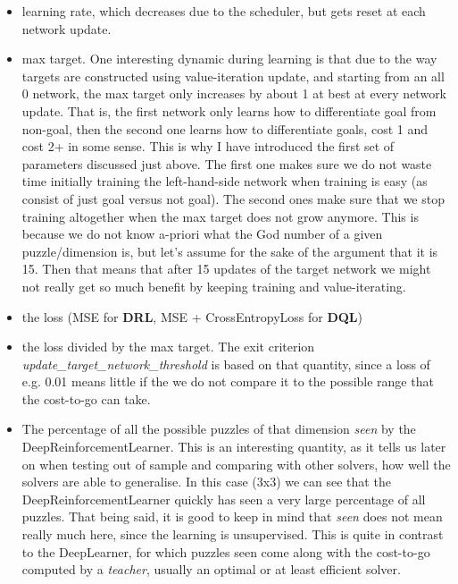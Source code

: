 \begin{itemize}
\item learning rate, which decreases due to the scheduler, but gets reset at each network update.
\item max target. One interesting dynamic during learning is that due to the way targets are constructed using value-iteration update, and starting from an all 0 network, the max target only increases by about 1 at best at every network update. That is, the first network only learns how to differentiate goal from non-goal, then the second one learns how to differentiate goals, cost 1 and cost 2+ in some sense. This is why I have introduced the first set of parameters discussed just above. The first one makes sure we do not waste time initially training the left-hand-side network when training is easy (as consist of just goal versus not goal). The second ones make sure that we stop training altogether when the max target does not grow anymore. This is because we do not know a-priori what the God number of a given puzzle/dimension is, but let's assume for the sake of the argument that it is 15. Then that means that after 15 updates of the target network we might not really get so much benefit by keeping training and value-iterating.
\item the loss (MSE for \textbf{DRL}, MSE + CrossEntropyLoss for \textbf{DQL})
\item the loss divided by the max target. The exit criterion \textit{update\_target\_network\_threshold} is based on that quantity, since a loss of e.g. 0.01 means little if the we do not compare it to the possible range that the cost-to-go can take.
\item The percentage of all the possible puzzles of that dimension \textit{seen} by the DeepReinforcementLearner. This is an interesting quantity, as it tells us later on when testing out of sample and comparing with other solvers, how well the solvers are able to generalise. In this case (3x3) we can see that the DeepReinforcementLearner quickly has seen a very large percentage of all puzzles. That being said, it is good to keep in mind that \textit{seen} does not mean really much here, since the learning is unsupervised. This is quite in contrast to the DeepLearner, for which puzzles seen come along with the cost-to-go computed by a \textit{teacher}, usually an optimal or at least efficient solver.
\end{itemize}


